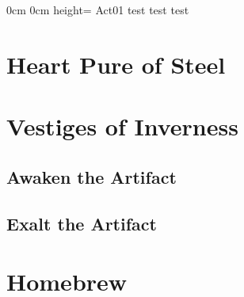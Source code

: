 	{}%
	{0cm}%
	{0cm}%
	{height=\paperheight}%
	{Act01}%
	{test}%
	{test}%
	{test}%
	




\chapter*{Heart Pure of Steel}\label{mi:HeartPureOfSteel}

\chapter*{Vestiges of Inverness} %
\section*{Awaken the Artifact}
\section*{Exalt the Artifact}





\chapter*{Homebrew}
